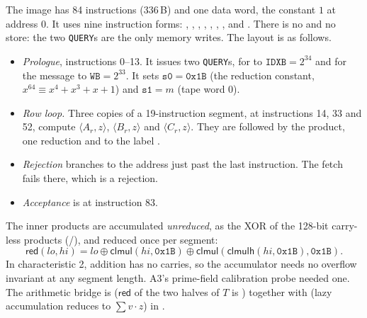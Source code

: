 The image has 84 instructions (336\,B) and one data word, the constant $1$ at address 0. It uses nine
instruction forms: , , , , , ,
,  and  \cite{RISCV-Bitmanip}. There is no  and no store:
the two \texttt{QUERY}s are the only memory writes. The layout is as follows.
\begin{itemize}[nosep]
\item \emph{Prologue}, instructions 0--13. It issues two \texttt{QUERY}s, for  to
  $\mathtt{IDXB}=2^{34}$ and for the message to $\mathtt{WB}=2^{33}$. It sets
  $\mathtt{s0}=\mathtt{0x1B}$ (the reduction constant, $x^{64}\equiv x^4+x^3+x+1$) and
  $\mathtt{s1}=m$ (tape word 0).
\item \emph{Row loop.} Three copies of a 19-instruction segment, at instructions 14, 33 and 52,
  compute $\langle A_r,z\rangle$, $\langle B_r,z\rangle$ and $\langle C_r,z\rangle$. They are followed
  by the product, one reduction and  to the label .
\item \emph{Rejection} branches to the address just past the last instruction. The fetch fails there,
  which is a rejection.
\item \emph{Acceptance} is  at instruction 83.
\end{itemize}
The inner products are accumulated \emph{unreduced}, as the XOR of the 128-bit carry-less products
(/), and reduced once per segment:
\[
  \mathsf{red}(\mathit{lo},\mathit{hi})=\mathit{lo}\oplus\mathsf{clmul}(\mathit{hi},\mathtt{0x1B})
  \oplus\mathsf{clmul}(\mathsf{clmulh}(\mathit{hi},\mathtt{0x1B}),\mathtt{0x1B}).
\]
In characteristic 2, addition has no carries, so the accumulator needs no overflow invariant at any
segment length. A3's prime-field calibration probe needed one. The arithmetic bridge is
 ($\mathsf{red}$ of the two halves of $T$ is ) together with
 (lazy accumulation reduces to $\sum v\cdot z$) in .

